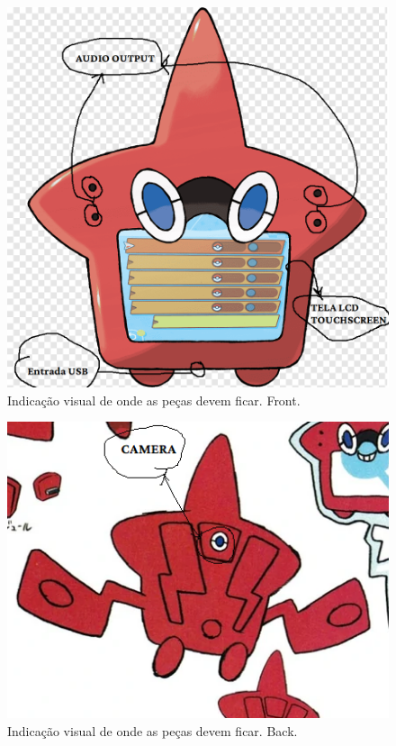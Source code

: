 \documentclass[../main.tex]{subfiles}
\begin{document}
\begin{figure}[H]
\centering
\includegraphics[scale=0.5]{../Images/hardwareFront.png}
\caption{Indicação visual de onde as peças devem ficar. Front.}
\end{figure}

\begin{figure}[H]
\centering
\includegraphics[scale=1]{../Images/hardwareBack.png}
\caption{Indicação visual de onde as peças devem ficar. Back.}
\end{figure}
\end{document}
